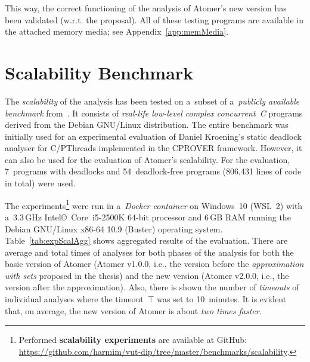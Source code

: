 This way, the correct functioning of the analysis of Atomer's new version has been validated (w.r.t. the proposal). All of these testing programs are available in the attached memory media; see Appendix~\ref{app:memMedia}.


\section{Scalability Benchmark}
\label{sec:expScal}

The \emph{scalability} of the analysis has been tested on a~subset of a~\emph{publicly available benchmark} from~\cite{deadlockKroening}. It consists of \emph{real-life low-level complex concurrent~C} programs derived from the Debian GNU/Linux distribution. The entire benchmark was initially used for an experimental evaluation of Daniel Kroening's static deadlock analyser for C/PThreads implemented in the CPROVER framework. However, it can also be used for the evaluation of Atomer's scalability. For the evaluation, 7~programs with deadlocks and 54~deadlock-free programs (806,431 lines of code in total) were used.

The experiments\footnote{Performed \textbf{scalability experiments} are available at GitHub: \url{https://github.com/harmim/vut-dip/tree/master/benchmarks/scalability}.} were run in a~\emph{Docker container} on Windows~10 (WSL~2) with a~3.3\,GHz Intel\copyright\ Core\texttrademark\ i5-2500K 64-bit processor and 6\,GB RAM running the Debian GNU/Linux x86-64 10.9 (Buster) operating system. Table~\ref{tab:expScalAgg} shows aggregated results of the evaluation. There are average and total times of analyses for both phases of the analysis for both the basic version of Atomer (Atomer v1.0.0, i.e., the version before the \emph{approximation with sets} proposed in the thesis) and the new version (Atomer v2.0.0, i.e., the version after the approximation). Also, there is shown the number of \emph{timeouts} of individual analyses where the timeout~$ \top $ was set to 10~minutes. It is evident that, on average, the new version of Atomer is about \emph{two times faster}.

